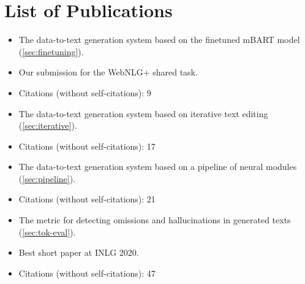 \chapter*{List of Publications}



\noindent{}
\begin{itemize}[noitemsep,topsep=0pt]

    \item The data-to-text generation system based on the finetuned mBART model (\autoref{sec:finetuning}).
    \item Our submission for the WebNLG+ shared task.
    \item Citations (without self-citations): 9
\end{itemize}\vspace{.5\baselineskip}

\noindent{}
\begin{itemize}[noitemsep,topsep=0pt]
    \item The data-to-text generation system based on iterative text editing (\autoref{sec:iterative}).
    \item Citations (without self-citations): 17

\end{itemize}\vspace{.5\baselineskip}

\noindent{}
\begin{itemize}[noitemsep,topsep=0pt]
    \item The data-to-text generation system based on a pipeline of neural modules (\autoref{sec:pipeline}).
    \item Citations (without self-citations): 21

\end{itemize}\vspace{.5\baselineskip}

\noindent{}
\begin{itemize}[noitemsep,topsep=0pt]

    \item The metric for detecting omissions and hallucinations in generated texts (\autoref{sec:tok-eval}).
    \item Best short paper at INLG 2020.
    \item Citations (without self-citations): 47

\end{itemize}\vspace{.5\baselineskip}


